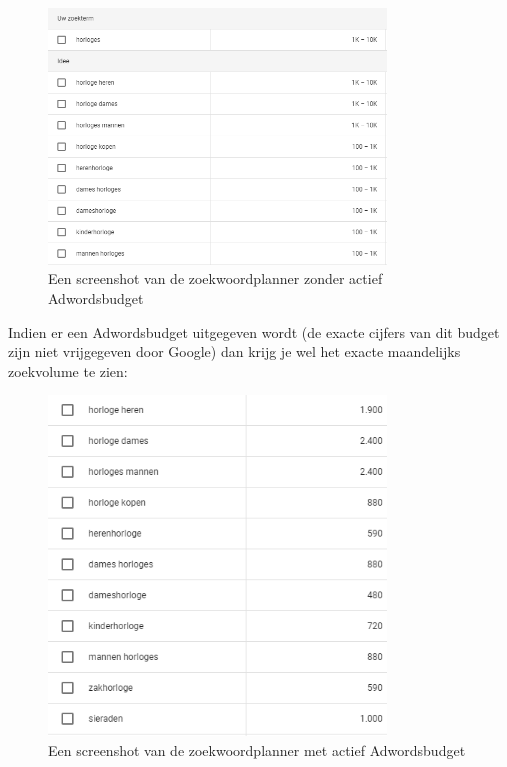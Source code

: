 \begin{figure}[h!]
\centering
\includegraphics[width=0.8\textwidth]{img/Zoekwoordplannergratis.PNG}
\caption{Een screenshot van de zoekwoordplanner zonder actief Adwordsbudget \autocite{google.be}}
\end{figure}

\newpage
Indien er een Adwordsbudget uitgegeven wordt (de exacte cijfers van dit budget zijn niet vrijgegeven door Google) dan krijg je wel het exacte maandelijks zoekvolume te zien: 

\begin{figure}[h!]
\centering
\includegraphics[width=0.8\textwidth]{img/Zoekwoordplannerbet.PNG}
\caption{Een screenshot van de zoekwoordplanner met actief Adwordsbudget}
\end{figure}


